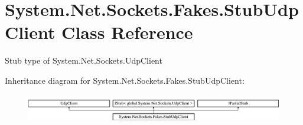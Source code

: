 \hypertarget{class_system_1_1_net_1_1_sockets_1_1_fakes_1_1_stub_udp_client}{\section{System.\-Net.\-Sockets.\-Fakes.\-Stub\-Udp\-Client Class Reference}
\label{class_system_1_1_net_1_1_sockets_1_1_fakes_1_1_stub_udp_client}
}


Stub type of System.\-Net.\-Sockets.\-Udp\-Client 


Inheritance diagram for System.\-Net.\-Sockets.\-Fakes.\-Stub\-Udp\-Client\-:\begin{figure}[H]
\begin{center}
\leavevmode
\includegraphics[height=1.338112cm]{class_system_1_1_net_1_1_sockets_1_1_fakes_1_1_stub_udp_client}
\end{center}
\end{figure}
